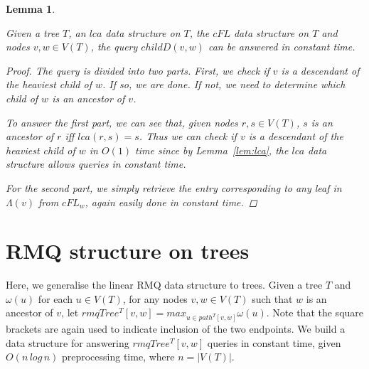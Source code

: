 \documentclass[12pt,a4paper]{article}
\newcommand{\leafset}{\Lambda}
\newcommand{\weight}{\omega}
\newtheorem{cfdquery}[incompatibility]{Lemma}
\begin{document}
    \medskip
    \begin{cfdquery}
        \label{lem:cfdquery}

        Given a tree $T$, an $lca$ data structure on $T$, the $cFL$ data structure on $T$ and nodes $v, w \in V(T)$, the query $childD(v, w)$ can be answered in constant time.

        \begin{proof}
            The query is divided into two parts. First, we check if $v$ is a descendant of the heaviest child of $w$. If so, we are done. If not, we need to determine which child of $w$ is an ancestor of $v$.

            To answer the first part, we can see that, given nodes $r, s \in V(T)$, $s$ is an ancestor of $r$ iff $lca(r, s) = s$. Thus we can check if $v$ is a descendant of the heaviest child of $w$ in $O(1)$ time since by Lemma~\ref{lem:lca}, the $lca$ data structure allows queries in constant time.

            For the second part, we simply retrieve the entry corresponding to any leaf in $\leafset(v)$ from $cFL_w$, again easily done in constant time.
        \end{proof}
    \end{cfdquery}

    \section{RMQ structure on trees}
    \label{sec:rmqtree}

    Here, we generalise the linear RMQ data structure to trees. Given a tree $T$ and $\weight(u)$ for each $u \in V(T)$, for any nodes $v, w \in V(T)$ such that $w$ is an ancestor of $v$, let $rmqTree^T[v, w] = max_{u \in path^T[v, w]}\weight(u)$. Note that the square brackets are again used to indicate inclusion of the two endpoints. We build a data structure for answering $rmqTree^T[v, w]$ queries in constant time, given $O(n\,log\,n)$ preprocessing time, where $n = |V(T)|$.
\end{document}
